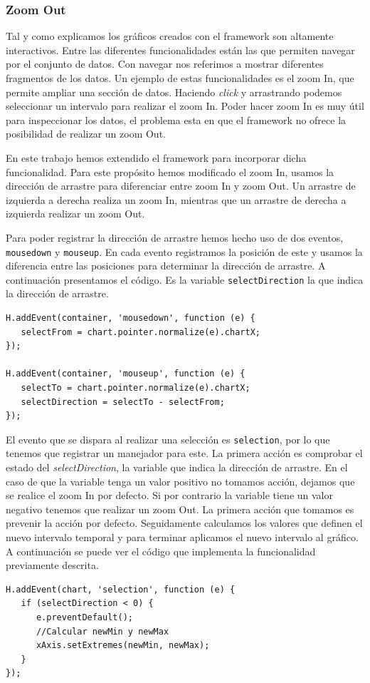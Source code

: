 		\subsubsection{Zoom Out}
			Tal y como explicamos los gráficos creados con el framework son altamente interactivos. Entre las diferentes funcionalidades
			están las que permiten navegar por el conjunto de datos. Con navegar nos referimos a mostrar diferentes fragmentos de los
			datos. Un ejemplo de estas funcionalidades es el zoom In, que permite ampliar una sección de datos. Haciendo \emph{click} y
			arrastrando podemos seleccionar un intervalo para realizar el zoom In. Poder hacer zoom In es muy útil para inspeccionar los
			datos, el problema esta en que el framework no ofrece la posibilidad de realizar un zoom Out.
			\par
			En este trabajo hemos extendido el framework para incorporar dicha funcionalidad. Para este propósito hemos modificado el zoom
			In, usamos la dirección de arrastre para diferenciar entre zoom In y zoom Out. Un arrastre de izquierda a derecha realiza un
			zoom In, mientras que un arrastre de derecha a izquierda realizar un zoom Out. 
			\par
			Para poder registrar la dirección de arrastre hemos hecho uso de dos eventos, \texttt{mousedown} y \texttt{mouseup}. En cada
			evento registramos la posición de este y usamos la diferencia entre las posiciones para determinar la dirección de arrastre. A
			continuación presentamos el código. Es la variable \texttt{selectDirection} la que indica la dirección de arrastre.
			\begin{lstlisting}[style=myJs]
H.addEvent(container, 'mousedown', function (e) {
   selectFrom = chart.pointer.normalize(e).chartX;
});

H.addEvent(container, 'mouseup', function (e) {
   selectTo = chart.pointer.normalize(e).chartX;
   selectDirection = selectTo - selectFrom;													            
});
			\end{lstlisting}
			\par
			El evento que se dispara al realizar una selección es \texttt{selection}, por lo que tenemos que registrar un manejador para
			este. La primera acción es comprobar el estado del \emph{selectDirection}, la variable que indica la dirección de arrastre. En
			el caso de que la variable tenga un valor positivo no tomamos acción, dejamos que se realice el zoom In por defecto. Si por
			contrario la variable tiene un valor negativo tenemos que realizar un zoom Out. La primera acción que tomamos es prevenir la
			acción por defecto. Seguidamente calculamos los valores que definen el nuevo intervalo temporal y para terminar aplicamos el
			nuevo intervalo al gráfico. A continuación se puede ver el código que implementa la funcionalidad previamente descrita.
			\begin{lstlisting}[style=myJs]
H.addEvent(chart, 'selection', function (e) {
   if (selectDirection < 0) {
      e.preventDefault();
      //Calcular newMin y newMax
      xAxis.setExtremes(newMin, newMax);
   }
});
			\end{lstlisting}
